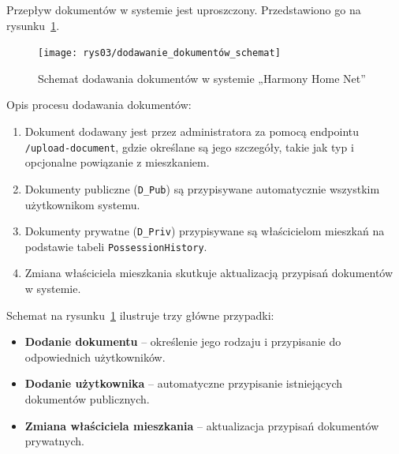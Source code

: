 
Przepływ dokumentów w systemie jest uproszczony. Przedstawiono go na rysunku~\ref{fig:document_schema}.
\begin{figure}[h]
    \centering
    \texttt{[image: rys03/dodawanie\_dokumentów\_schemat]}
    \caption{Schemat dodawania dokumentów w systemie „Harmony Home Net”}
    \label{fig:document_schema}
\end{figure}

Opis procesu dodawania dokumentów:
\begin{enumerate}
    \item Dokument dodawany jest przez administratora za pomocą endpointu \texttt{/upload-document}, gdzie określane są jego szczegóły, takie jak typ i opcjonalne powiązanie z mieszkaniem.
    \item Dokumenty publiczne (\texttt{D\_Pub}) są przypisywane automatycznie wszystkim użytkownikom systemu.
    \item Dokumenty prywatne (\texttt{D\_Priv}) przypisywane są właścicielom mieszkań na podstawie tabeli \texttt{PossessionHistory}.
    \item Zmiana właściciela mieszkania skutkuje aktualizacją przypisań dokumentów w systemie.
\end{enumerate}

Schemat na rysunku~\ref{fig:document_schema} ilustruje trzy główne przypadki:
\begin{itemize}
    \item \textbf{Dodanie dokumentu} -- określenie jego rodzaju i przypisanie do odpowiednich użytkowników.
    \item \textbf{Dodanie użytkownika} -- automatyczne przypisanie istniejących dokumentów publicznych.
    \item \textbf{Zmiana właściciela mieszkania} -- aktualizacja przypisań dokumentów prywatnych.
\end{itemize}



